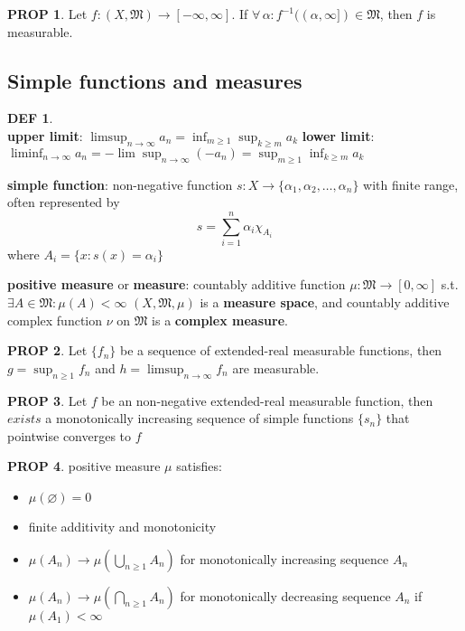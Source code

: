 \documentclass[hidelinks,10pt]{article}
\theoremstyle{definition}
\newtheorem*{defin}{DEF}
\theoremstyle{dotles}
\theoremstyle{dotless}
\newtheorem{proposition}{PROP}[section]
\theoremstyle{remark}
\begin{document}
\begin{proposition}
Let $f:(X,\mathfrak{M})\to[-\infty,\infty]$. If $\forall\,\alpha:f^{-1}((\alpha,\infty])\in\mathfrak{M}$, then $f$ is measurable.
\end{proposition}

\subsection{Simple functions and measures}

\begin{defin}~\\
\textbf{upper limit}: $\limsup_{n\to\infty}a_n=\inf_{m\geq1}\sup_{k\geq m}a_k$\newline
\textbf{lower limit}: $\liminf_{n\to\infty}a_n=-\lim\sup_{n\to\infty}(-a_n)=\sup_{m\geq1}\inf_{k\geq m}a_k$\bigbreak

\textbf{simple function}: non-negative function $s:X\to\{\alpha_1,\alpha_2,\dots,\alpha_n\}$ with finite range, often represented by
\[s=\sum_{i=1}^n\alpha_i\chi_{A_i}\]
where $A_i=\{x:s(x)=\alpha_i\}$\bigbreak

\textbf{positive measure} or \textbf{measure}: countably additive function $\mu:\mathfrak{M}\to[0,\infty]$ s.t. $\exists A\in\mathfrak{M}:\mu(A)<\infty$\newline
$(X,\mathfrak{M},\mu)$ is a \textbf{measure space}, and countably additive complex function $\nu$ on $\mathfrak{M}$ is a \textbf{complex measure}.
\end{defin}

\begin{proposition}
Let $\{f_n\}$ be a sequence of extended-real measurable functions, then $g=\sup_{n\geq1}f_n$ and $h=\limsup_{n\to\infty}f_n$ are measurable.
\end{proposition}

\begin{proposition}
Let $f$ be an non-negative extended-real measurable function, then $exists$ a monotonically increasing sequence of simple functions $\{s_n\}$ that pointwise converges to $f$
\end{proposition}

\begin{proposition}
positive measure $\mu$ satisfies:\begin{itemize}
    \item $\mu(\varnothing)=0$
    \item finite additivity and monotonicity
    \item {} $\mu(A_n)\to\mu(\bigcup_{n\geq1}A_n)$ for monotonically increasing sequence $A_n$
    \item {} $\mu(A_n)\to\mu(\bigcap_{n\geq1}A_n)$ for monotonically decreasing sequence $A_n$ if $\mu(A_1)<\infty$
\end{itemize}
\end{proposition}
\end{document}
